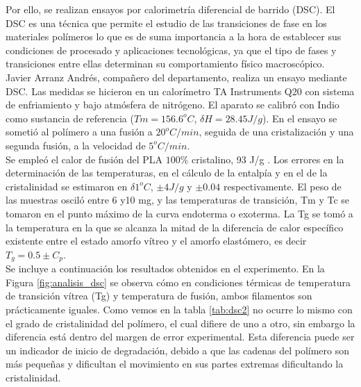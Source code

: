 Por ello, se realizan ensayos por calorimetría diferencial de barrido (DSC). El DSC es una técnica que permite el estudio de las transiciones de fase en los materiales polímeros \cite{DSC1} lo que es de suma importancia a la hora de establecer sus condiciones de procesado y aplicaciones tecnológicas, ya que el tipo de fases y transiciones entre ellas determinan su comportamiento físico macroscópico.\\

Javier Arranz Andrés, compañero del departamento, realiza un ensayo mediante DSC. Las medidas se hicieron en un calorímetro TA Instruments Q20 con sistema de enfriamiento y bajo atmósfera de nitrógeno. El aparato se calibró con Indio como sustancia de referencia ($Tm = 156.6 ^o C$, $\delta H = 28.45 J/g$). En el ensayo se sometió al polímero a una fusión a $20 ^o C/min$, seguida de una cristalización y una segunda fusión, a la velocidad de $5 ^o C/min$.\\

Se empleó el calor de fusión del PLA $100\%$ cristalino, 93 J/g \cite{DSC}. Los errores en la determinación de las temperaturas, en el cálculo de la entalpía y en el de la cristalinidad se estimaron en $\delta1 ^o C$, $\pm4 J/g$ y $\pm0.04$ respectivamente. El peso de las muestras osciló entre 6 y10 mg, y las temperaturas de transición, Tm y Tc se tomaron en el punto máximo de la curva endoterma o exoterma. La Tg se tomó a la temperatura en la que se alcanza la mitad de la diferencia de calor específico existente entre el estado amorfo vítreo y el amorfo elastómero, es decir $T_{g} = 0.5 \pm C_{p}$.\\

Se incluye a continuación los resultados obtenidos en el experimento. En la Figura \ref{fig:analisis_dsc} se observa cómo en condiciones térmicas de temperatura de transición vítrea (Tg) y temperatura de fusión, ambos filamentos son prácticamente iguales. Como vemos en la tabla \ref{tab:dsc2} no ocurre lo mismo con el grado de cristalinidad del polímero, el cual difiere de uno a otro, sin embargo la diferencia está dentro del margen de error experimental. Esta diferencia puede ser un indicador de inicio de degradación, debido a que las cadenas del polímero son más pequeñas y dificultan el movimiento en sus partes extremas dificultando la cristalinidad.

